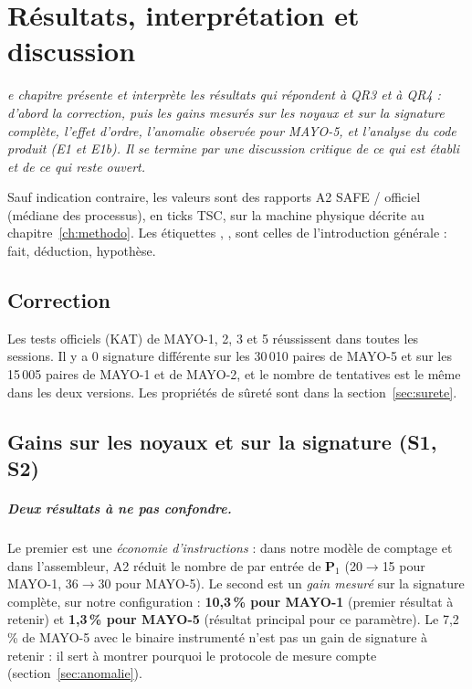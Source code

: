 \let\textcircled=\pgftextcircled
\chapter[Résultats et discussion]{Résultats, interprétation et discussion}
\label{ch:resultats}

\bigskip

\textit{e chapitre présente et interprète les résultats qui répondent à QR3 et à QR4 : d'abord la correction, puis les gains mesurés sur les noyaux et sur la signature complète, l'effet d'ordre, l'anomalie observée pour MAYO-5, et l'analyse du code produit (E1 et E1b). Il se termine par une discussion critique de ce qui est établi et de ce qui reste ouvert.}

\newpage


Sauf indication contraire, les valeurs sont des rapports A2 SAFE / officiel (médiane des processus), en ticks TSC, sur la machine physique décrite au chapitre~\ref{ch:methodo}. Les étiquettes \F{}, \I{}, \Hy{} sont celles de l'introduction générale : \F{} fait, \I{} déduction, \Hy{} hypothèse.

\section{Correction}
\F{} Les tests officiels (KAT) de MAYO-1, 2, 3 et 5 réussissent dans toutes les sessions. Il y a 0 signature différente sur les 30\,010 paires de MAYO-5 et sur les 15\,005 paires de MAYO-1 et de MAYO-2, et le nombre de tentatives est le même dans les deux versions. Les propriétés de sûreté sont dans la section~\ref{sec:surete}.

\section{Gains sur les noyaux et sur la signature (S1, S2)}
\paragraph{Deux résultats à ne pas confondre.} Le premier est une \emph{économie d'instructions} : dans notre modèle de comptage et dans l'assembleur, A2 réduit le nombre de  par entrée de $\mathbf{P}_1$ (20$\to$15 pour MAYO-1, 36$\to$30 pour MAYO-5). Le second est un \emph{gain mesuré} sur la signature complète, sur notre configuration : \textbf{10,3\,\% pour MAYO-1} (premier résultat à retenir) et \textbf{1,3\,\% pour MAYO-5} (résultat principal pour ce paramètre). Le 7,2\,\% de MAYO-5 avec le binaire instrumenté n'est pas un gain de signature à retenir : il sert à montrer pourquoi le protocole de mesure compte (section~\ref{sec:anomalie}).

